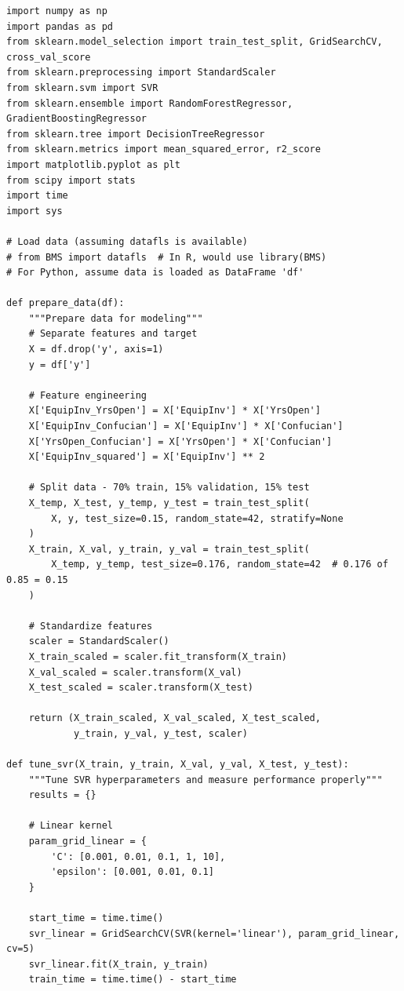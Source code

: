 \documentclass[12pt,a4paper]{article}
\theoremstyle{definition}
\begin{document}
\begin{lstlisting}[caption={Data Preparation and SVR Implementation with Proper Metrics}]
import numpy as np
import pandas as pd
from sklearn.model_selection import train_test_split, GridSearchCV, cross_val_score
from sklearn.preprocessing import StandardScaler
from sklearn.svm import SVR
from sklearn.ensemble import RandomForestRegressor, GradientBoostingRegressor
from sklearn.tree import DecisionTreeRegressor
from sklearn.metrics import mean_squared_error, r2_score
import matplotlib.pyplot as plt
from scipy import stats
import time
import sys

# Load data (assuming datafls is available)
# from BMS import datafls  # In R, would use library(BMS)
# For Python, assume data is loaded as DataFrame 'df'

def prepare_data(df):
    """Prepare data for modeling"""
    # Separate features and target
    X = df.drop('y', axis=1)
    y = df['y']
    
    # Feature engineering
    X['EquipInv_YrsOpen'] = X['EquipInv'] * X['YrsOpen']
    X['EquipInv_Confucian'] = X['EquipInv'] * X['Confucian']
    X['YrsOpen_Confucian'] = X['YrsOpen'] * X['Confucian']
    X['EquipInv_squared'] = X['EquipInv'] ** 2
    
    # Split data - 70% train, 15% validation, 15% test
    X_temp, X_test, y_temp, y_test = train_test_split(
        X, y, test_size=0.15, random_state=42, stratify=None
    )
    X_train, X_val, y_train, y_val = train_test_split(
        X_temp, y_temp, test_size=0.176, random_state=42  # 0.176 of 0.85 = 0.15
    )
    
    # Standardize features
    scaler = StandardScaler()
    X_train_scaled = scaler.fit_transform(X_train)
    X_val_scaled = scaler.transform(X_val)
    X_test_scaled = scaler.transform(X_test)
    
    return (X_train_scaled, X_val_scaled, X_test_scaled, 
            y_train, y_val, y_test, scaler)

def tune_svr(X_train, y_train, X_val, y_val, X_test, y_test):
    """Tune SVR hyperparameters and measure performance properly"""
    results = {}
    
    # Linear kernel
    param_grid_linear = {
        'C': [0.001, 0.01, 0.1, 1, 10],
        'epsilon': [0.001, 0.01, 0.1]
    }
    
    start_time = time.time()
    svr_linear = GridSearchCV(SVR(kernel='linear'), param_grid_linear, cv=5)
    svr_linear.fit(X_train, y_train)
    train_time = time.time() - start_time
    

\end{lstlisting}
\end{document}
